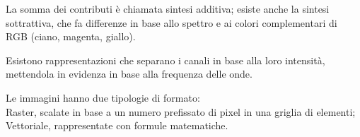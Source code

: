 La somma dei contributi è chiamata sintesi additiva; esiste anche la sintesi sottrattiva, che fa differenze in base allo spettro e ai colori complementari di RGB (ciano, magenta, giallo). 

Esistono rappresentazioni che separano i canali in base alla loro intensità, mettendola in evidenza in base alla frequenza delle onde. 

Le immagini hanno due tipologie di formato: \\
Raster, scalate in base a un numero prefissato di pixel in una griglia di elementi; \\
Vettoriale, rappresentate con formule matematiche.
   


